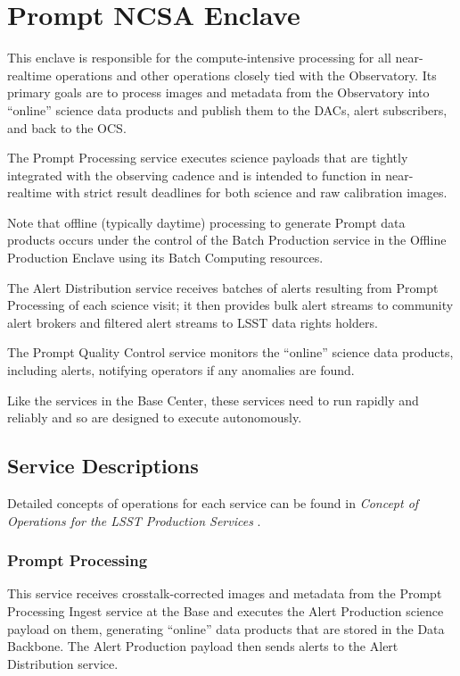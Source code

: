 \documentclass[DM,toc,lsstdraft]{lsstdoc}
\begin{document}
\section{Prompt NCSA Enclave}\label{prompt-ncsa-enclave}

This enclave is responsible for the compute-intensive processing for all
near-realtime operations and other operations closely tied with the
Observatory. Its primary goals are to process images and metadata from
the Observatory into ``online'' science data products and publish them
to the DACs, alert subscribers, and back to the OCS.

The Prompt Processing service executes science payloads that are tightly integrated with the observing cadence and is intended to function in near-realtime with strict result deadlines for both science and raw calibration images.

Note that offline (typically daytime) processing to generate Prompt data products occurs under the control of the Batch Production service in the Offline Production Enclave using its Batch Computing resources.

The Alert Distribution service receives batches of alerts resulting from Prompt Processing of each science visit; it then provides bulk alert streams to community alert brokers and filtered alert streams to LSST data rights holders.

The Prompt Quality Control service monitors the ``online'' science data
products, including alerts, notifying operators if any anomalies are
found.

Like the services in the Base Center, these services need to run
rapidly and reliably and so are designed to execute autonomously.

\subsection{Service Descriptions}\label{prompt-ncsa-service-descriptions}

Detailed concepts of operations for each service can be found in
\textit{Concept of Operations for the LSST Production Services} .

\subsubsection{Prompt Processing}\label{prompt-processing}

This service receives crosstalk-corrected images and metadata from the
Prompt Processing Ingest service at the Base and executes the Alert
Production science payload on them, generating ``online'' data products
that are stored in the Data Backbone. The Alert Production payload then
sends alerts to the Alert Distribution service.
\end{document}

